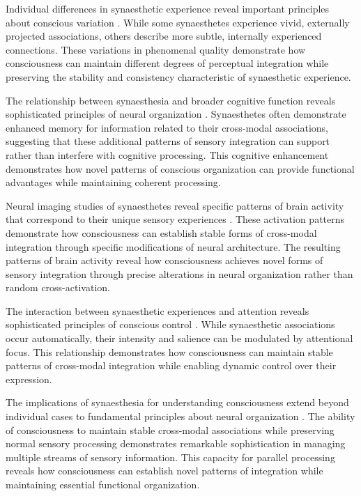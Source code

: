 Individual differences in synaesthetic experience reveal important principles about conscious variation \cite{Dixon2004}. While some synaesthetes experience vivid, externally projected associations, others describe more subtle, internally experienced connections. These variations in phenomenal quality demonstrate how consciousness can maintain different degrees of perceptual integration while preserving the stability and consistency characteristic of synaesthetic experience.

The relationship between synaesthesia and broader cognitive function reveals sophisticated principles of neural organization \cite{Kadosh2007}. Synaesthetes often demonstrate enhanced memory for information related to their cross-modal associations, suggesting that these additional patterns of sensory integration can support rather than interfere with cognitive processing. This cognitive enhancement demonstrates how novel patterns of conscious organization can provide functional advantages while maintaining coherent processing.

Neural imaging studies of synaesthetes reveal specific patterns of brain activity that correspond to their unique sensory experiences \cite{Nunn2002}. These activation patterns demonstrate how consciousness can establish stable forms of cross-modal integration through specific modifications of neural architecture. The resulting patterns of brain activity reveal how consciousness achieves novel forms of sensory integration through precise alterations in neural organization rather than random cross-activation.

The interaction between synaesthetic experiences and attention reveals sophisticated principles of conscious control \cite{Mattingley2001}. While synaesthetic associations occur automatically, their intensity and salience can be modulated by attentional focus. This relationship demonstrates how consciousness can maintain stable patterns of cross-modal integration while enabling dynamic control over their expression.

The implications of synaesthesia for understanding consciousness extend beyond individual cases to fundamental principles about neural organization \cite{Ramachandran2001}. The ability of consciousness to maintain stable cross-modal associations while preserving normal sensory processing demonstrates remarkable sophistication in managing multiple streams of sensory information. This capacity for parallel processing reveals how consciousness can establish novel patterns of integration while maintaining essential functional organization.

